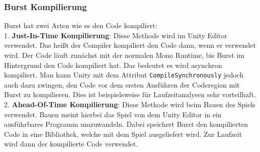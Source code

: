 \subsubsection{Burst Kompilierung}
Burst hat zwei Arten wie es den Code kompiliert:\\
1. \textbf{Just-In-Time Kompilierung}: Diese Methode wird im Unity Editor verwendet. Das heißt der Compiler kompiliert den Code dann, wenn er verwendet wird. Der Code läuft zunächst mit der normalen Mono Runtime, bis Burst im Hintergrund den Code kompiliert hat. Das bedeutet es wird asynchron kompiliert. Man kann Unity mit dem Attribut \texttt{CompileSynchronously} jedoch auch dazu zwingen, den Code vor dem ersten Ausführen der Coderegion mit Burst zu kompilieren. Dies ist beispielsweise für Laufzeitanalysen sehr vorteilhaft.\\
2. \textbf{Ahead-Of-Time Kompilierung}: Diese Methode wird beim Bauen des Spiels verwendet. Bauen meint hierbei das Spiel von dem Unity Editor in ein ausführbares Programm umzuwandeln. Dabei speichert Burst den kompilierten Code in eine Bibliothek, welche mit dem Spiel ausgeliefert wird. Zur Laufzeit wird dann der kompilierte Code verwendet.
